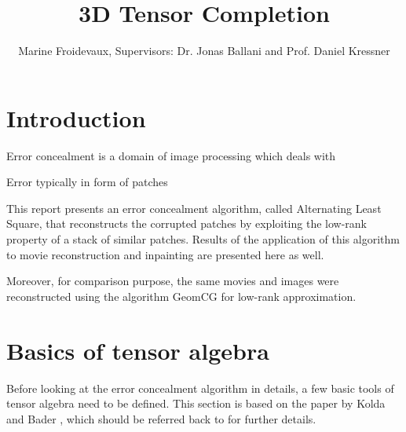 \documentclass[a4paper, 11pt]{article} %
\newcommand{\mail}[1]{{\href{mailto:#1}{#1}}}
\begin{document}
\title{3D Tensor Completion\\ \textsc{}}
\author{Marine Froidevaux, Supervisors: Dr. Jonas Ballani and Prof. Daniel Kressner }%




\maketitle
%
\thispagestyle{empty}
\setcounter{tocdepth}{2} %
\tableofcontents
\newpage
{}



\section{Introduction}
Error concealment is a domain of image processing which deals with

Error typically in form of patches 

This report presents an error concealment algorithm, called Alternating Least Square, that reconstructs the corrupted patches by exploiting the low-rank property of a stack of similar patches. Results of the application of this algorithm to movie reconstruction and inpainting are presented here as well. 

Moreover, for comparison purpose, the same movies and images were reconstructed using the algorithm GeomCG for low-rank approximation.

\section{Basics of tensor algebra}
Before looking at the error concealment algorithm in details, a few basic tools of tensor algebra need to be defined.
This section is based on the paper by Kolda and Bader \cite{Kolda-Bader}, which should be referred back to for further details.
\end{document}
